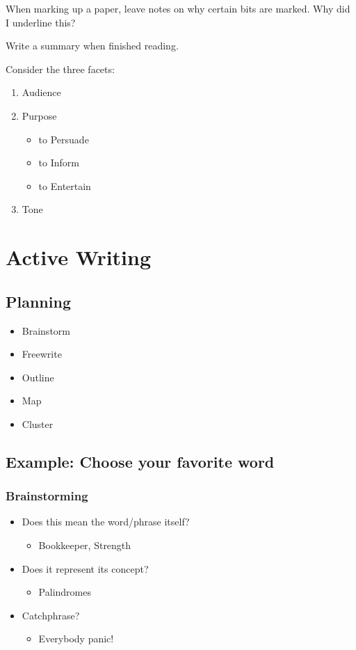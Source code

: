 \documentclass[12pt]{article}
\begin{document}
When marking up a paper, leave notes on why certain bits are marked.
Why did I underline this?

Write a summary when finished reading.

Consider the three facets:
\begin{enumerate}
    \item Audience
    \item Purpose
    \begin{itemize}
        \item to Persuade
        \item to Inform
        \item to Entertain
    \end{itemize}
    \item Tone
\end{enumerate}

\section{Active Writing}

\subsection{Planning}

\begin{itemize}
    \item Brainstorm
    \item Freewrite
    \item Outline
    \item Map
    \item Cluster
\end{itemize}

\pagebreak

\subsection{Example: Choose your favorite word}

\subsubsection{Brainstorming}
\begin{itemize}
    \item Does this mean the word/phrase itself?
    \begin{itemize}
        \item Bookkeeper, Strength
    \end{itemize}

    \item Does it represent its concept?
    \begin{itemize}
        \item Palindromes
    \end{itemize}

    \item Catchphrase?
    \begin{itemize}
        \item Everybody panic!
    \end{itemize}
\end{itemize}
\end{document}
